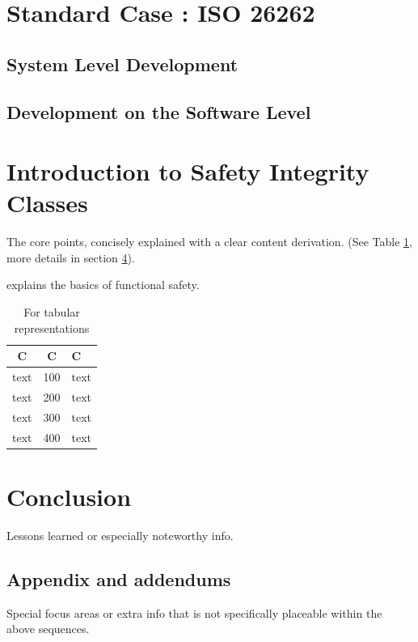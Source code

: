 \documentclass[a4paper,11pt,twoside]{article}
\begin{document}
\section{Standard Case : ISO 26262}
\subsection{System Level Development}
\subsection{Development on the Software Level}


\section{Introduction to Safety Integrity Classes}

The core points, concisely explained with a clear content derivation. (See Table \ref{tab:boringdetails}, more details in section \ref{sec:details}).

explains the basics of functional safety.

\begin{table}[h]
\centering
\label{tab:boringdetails}
\begin{tabular}{|c|c|l|} \hline
C & C & C\\ \hline\hline
text & 100 & text \\ \hline
text & 200 & text \\ \hline
text & 300 & text \\ \hline
text & 400 & text \\ \hline
\end{tabular}
\caption{For tabular representations}
\end{table}

% 

\section{Conclusion}

Lessons learned or especially noteworthy info.








\begin{appendix}
\section{Appendix and addendums}
\label{sec:details}

%	

Special focus areas or extra info that is not specifically placeable within the above sequences.

\end{appendix}
\end{document}
